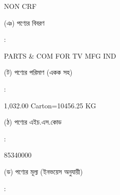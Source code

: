 \documentclass[12pt]{article}
\newcommand{\good}{PARTS \& COM FOR TV MFG IND}
\newcommand{\pkg}{1,032.00 Carton=10456.25 KG}
\newcommand{\hscode}{85340000}
\newcommand{\crf}{NON CRF}
\newcommand{\crfdt}{}
\begin{document}
\begin{minipage}[t]{0.53\linewidth}
{\crf} \hspace{2em} {\crfdt}
\\
\end{minipage}
\begin{minipage}[t]{0.05\linewidth}
\hspace*{1em}
\end{minipage}
\begin{minipage}[t]{0.40\linewidth}
(ঞ) পণ্যের বিবরণ
\end{minipage}
\begin{minipage}[t]{0.02\linewidth}
:
\end{minipage}
\begin{minipage}[t]{0.53\linewidth}
{\good}
\\
\end{minipage}
\begin{minipage}[t]{0.05\linewidth}
\hspace*{1em}
\end{minipage}
\begin{minipage}[t]{0.40\linewidth}
(ট) পণ্যের পরিমাণ (একক সহ)
\end{minipage}
\begin{minipage}[t]{0.02\linewidth}
:
\end{minipage}
\begin{minipage}[t]{0.53\linewidth}
{\pkg}
\\
\end{minipage}
\begin{minipage}[t]{0.05\linewidth}
\hspace*{1em}
\end{minipage}
\begin{minipage}[t]{0.40\linewidth}
(ঠ) পণ্যের এইচ.এস.কোড
\end{minipage}
\begin{minipage}[t]{0.02\linewidth}
:
\end{minipage}
\begin{minipage}[t]{0.53\linewidth}
{\hscode}
\\
\end{minipage}
\begin{minipage}[t]{0.05\linewidth}
\hspace*{1em}
\end{minipage}
\begin{minipage}[t]{0.40\linewidth}
(ড) পণ্যের মূল্য (ইনভয়েস অনুযায়ী)
\end{minipage}
\begin{minipage}[t]{0.02\linewidth}
:
\end{minipage}
\end{document}
